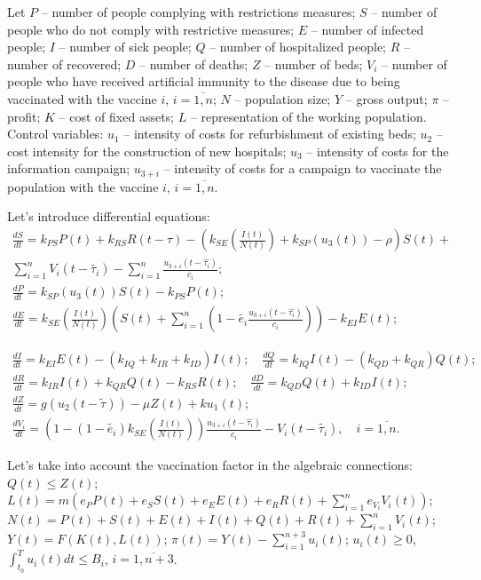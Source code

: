 \documentclass[12pt]{llncs}
\begin{document}
Let $P$ -- number of people complying with restrictions measures; $S$ -- number of people who do not comply with restrictive measures; $E$ -- number of infected people; $I$ -- number of sick people; $Q$ -- number of hospitalized people; $R$ -- number of recovered; $D$ -- number of deaths; $Z$ -- number of beds; $V_i$ -- number of people who have received artificial immunity to the disease due to being vaccinated with the vaccine $i$, $i=\overline{1,n}$; $N$ -- population size; $Y$ -- gross output; $\pi$ -- profit; $K$ -- cost of fixed assets; $L$ -- representation of the working population. Control variables: $u_1$ -- intensity of costs for refurbishment of existing beds; $u_2$ -- cost intensity for the construction of new hospitals; $u_3$ -- intensity of costs for the information campaign; $u_{3+i}$ -- intensity of costs for a campaign to vaccinate the population with the vaccine $i$, $i=\overline{1,n}$.

Let's introduce differential equations:
$$\begin{array}{c}
   \displaystyle\frac{dS}{dt}=k_{PS}P(t)+k_{RS}R(t-\tau)- \left(k_{SE}\left(\frac{I(t)}{N(t)}\right)+k_{SP}(u_3(t))-\rho\right)S(t)+\\ \displaystyle\sum_{i=1}^{n}V_i(t-\widetilde{\tau_i})- \sum_{i=1}^{n}\frac{u_{3+i}(t-\widehat{\tau_i})}{c_i}; \\ \displaystyle\frac{dP}{dt}=k_{SP}(u_3(t))S(t)-k_{PS}P(t); \\ \displaystyle\frac{dE}{dt}=k_{SE}\left(\frac{I(t)}{N(t)}\right) \left(S(t)+\sum_{i=1}^{n}(1-\widetilde{e_i}\frac{u_{3+i}(t-\widehat{\tau_i})}{c_i}) \right)-k_{EI}E(t);
\end{array}$$  

$$\begin{array}{c}
   \displaystyle\frac{dI}{dt}= k_{EI}E(t)-(k_{IQ}+k_{IR}+k_{ID})I(t); \quad \displaystyle\frac{dQ}{dt}= k_{IQ}I(t)-(k_{QD}+k_{QR})Q(t);\\ \displaystyle\frac{dR}{dt}= k_{IR}I(t)+k_{QR}Q(t)-k_{RS}R(t); \quad \displaystyle\frac{dD}{dt}= k_{QD}Q(t)+k_{ID}I(t);\\
   \displaystyle\frac{dZ}{dt}= g(u_2(t-\tilde{\tau}))-\mu Z(t)+ku_1(t); \\
   \displaystyle\frac{dV_i}{dt}= \left(1-(1-\widetilde{e_i})k_{SE}\left(\frac{I(t)}{N(t)}\right)\right) \frac{u_{3+i}(t-\widehat{\tau_i})}{c_i}-V_i(t-\widetilde{\tau_i}),\quad i=\overline{1,n}.
  \end{array}
$$

Let's take into account the vaccination factor in the algebraic connections:  $Q(t)\leq Z(t)$; $L(t)=\displaystyle m\left(e_PP(t)+e_SS(t)+e_EE(t)+e_RR(t)+\sum_{i=1}^{n}e_{V_i}V_i(t)\right)$; $N(t)=P(t)+S(t)+E(t)+I(t)+Q(t)+R(t)+\displaystyle\sum_{i=1}^{n}V_i(t)$;
$Y(t)=F(K(t),L(t))$; $\pi(t)=Y(t)-\displaystyle\sum_{i=1}^{n+3}u_i(t)$;
$u_i(t)\geq 0$, $\displaystyle\int_{t_0}^T u_i(t)dt\leq B_i$, $i=\overline{1,n+3}$. 
\end{document}
